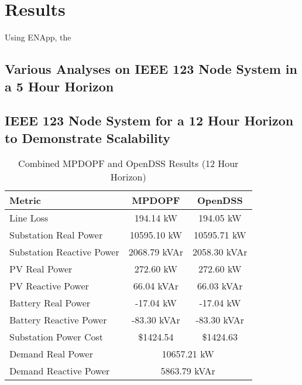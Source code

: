 \documentclass{article}
\begin{document}
\section{Results}

Using ENApp, the 
\subsection*{Various Analyses on IEEE 123 Node System in a 5 Hour Horizon}

\subsection*{IEEE 123 Node System for a 12 Hour Horizon to Demonstrate Scalability}
\begin{table}[h!]
    \centering
    \caption{Combined MPDOPF and OpenDSS Results (12 Hour Horizon)}
    \begin{tabular}{|l|c|c|}
    \hline
    \textbf{Metric} & \textbf{MPDOPF} & \textbf{OpenDSS} \\ \hline
    Line Loss & 194.14 kW & 194.05 kW \\ \hline
    Substation Real Power & 10595.10 kW & 10595.71 kW \\ \hline
    Substation Reactive Power & 2068.79 kVAr & 2058.30 kVAr \\ \hline
    PV Real Power & 272.60 kW & 272.60 kW \\ \hline
    PV Reactive Power & 66.04 kVAr & 66.03 kVAr \\ \hline
    Battery Real Power & -17.04 kW & -17.04 kW \\ \hline
    Battery Reactive Power & -83.30 kVAr & -83.30 kVAr \\ \hline
    Substation Power Cost & \$1424.54 & \$1424.63 \\ \hline
    Demand Real Power & \multicolumn{2}{c|}{10657.21 kW} \\ \hline
    Demand Reactive Power & \multicolumn{2}{c|}{5863.79 kVAr} \\ \hline
    \end{tabular}
    \label{table:combined_results_slim}
    \end{table}
    
    
    
    
    
    
\lipsum[1]
\end{document}
